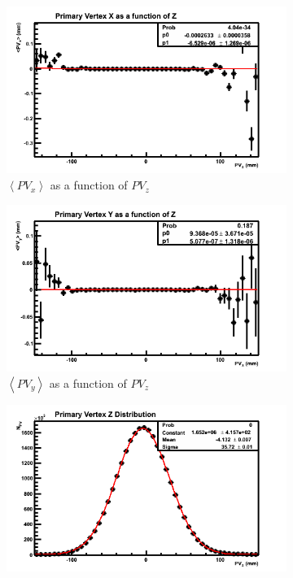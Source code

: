 \begin{figure}[h]
	\centering
	\begin{subfigure}{0.49\textwidth}
		\includegraphics[width=\textwidth]{./Chapters/multiplicity/images/beamline_x_of_z.png}
		\caption{$\left<PV_x\right>$ as a function of $PV_z$}
		\label{fig: pv_distributions mc mag down x_of_z}
	\end{subfigure}
	\begin{subfigure}{0.49\textwidth}
		\includegraphics[width=\textwidth]{./Chapters/multiplicity/images/beamline_y_of_z.png}
		\caption{$\left<PV_y\right>$ as a function of $PV_z$}
		\label{fig: pv_distributions mc mag down y_of_z}
	\end{subfigure}
	\begin{subfigure}{0.49\textwidth}
		\includegraphics[width=\textwidth]{./Chapters/multiplicity/images/beamline_z.png}

\end{subfigure}
\end{figure}

